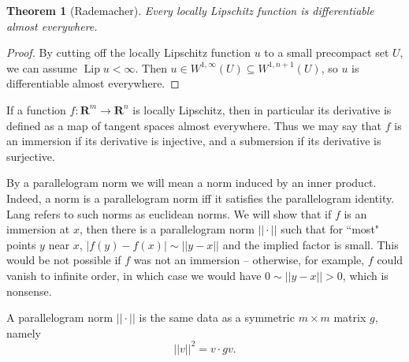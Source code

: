 \documentclass[reqno,12pt,letterpaper]{amsart}
\newcommand{\RR}{\mathbf{R}}
\DeclareMathOperator{\Lip}{Lip}
\newtheorem{theorem}{Theorem}[section]
\theoremstyle{definition}
\numberwithin{equation}{section}
\begin{document}
\begin{theorem}[Rademacher]
Every locally Lipschitz function is differentiable almost everywhere.
\end{theorem}
\begin{proof}
By cutting off the locally Lipschitz function $u$ to a small precompact set $U$, we can assume $\Lip u < \infty$.
Then $u \in W^{1, \infty}(U) \subseteq W^{1, n + 1}(U)$, so $u$ is differentiable almost everywhere.
\end{proof}

If a function $f: \RR^m \to \RR^n$ is locally Lipschitz, then in particular its derivative is defined as a map of tangent spaces almost everywhere.
Thus we may say that $f$ is an immersion if its derivative is injective, and a submersion if its derivative is surjective.

By a parallelogram norm we will mean a norm induced by an inner product.
Indeed, a norm is a parallelogram norm iff it satisfies the parallelogram identity.
Lang refers to such norms as euclidean norms.
We will show that if $f$ is an immersion at $x$, then there is a parallelogram norm $||\cdot||$ such that for ``most" points $y$ near $x$, $|f(y) - f(x)| \sim ||y - x||$ and the implied factor is small.
This would be not possible if $f$ was not an immersion -- otherwise, for example, $f$ could vanish to infinite order, in which case we would have $0 \sim ||y - x|| > 0$, which is nonsense.

A parallelogram norm $||\cdot||$ is the same data as a symmetric $m \times m$ matrix $g$, namely
$$||v||^2 = v \cdot gv.$$
\end{document}
